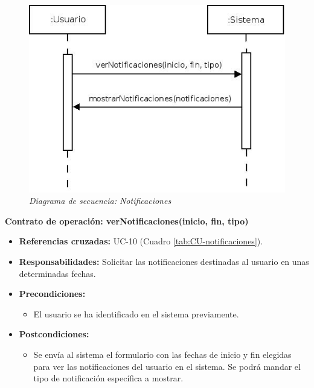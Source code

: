\vspace{10mm}

\begin{figure}[H]
\centering
  \includegraphics[scale=.50]{img/secuencias/notificaciones.jpeg}
  \caption{\textit{Diagrama de secuencia: Notificaciones}}
  \label{fig:secuencia-notificaciones}
\end{figure}

\textbf{Contrato de operación: verNotificaciones(inicio, fin, tipo)}
\begin{itemize}
\item \textbf{Referencias cruzadas:} UC-10 (Cuadro \ref{tab:CU-notificaciones}).
\item \textbf{Responsabilidades:} Solicitar las notificaciones destinadas al usuario en unas determinadas fechas.
\item \textbf{Precondiciones:} 
 \begin{itemize}
\item El usuario se ha identificado en el sistema previamente.
\end {itemize}
\item \textbf{Postcondiciones:} 
 \begin{itemize}
\item Se envía al sistema el formulario con las fechas de inicio y fin elegidas para ver las notificaciones del usuario en el sistema. Se podrá mandar el tipo de notificación específica a mostrar.
\end {itemize}
\end {itemize}


